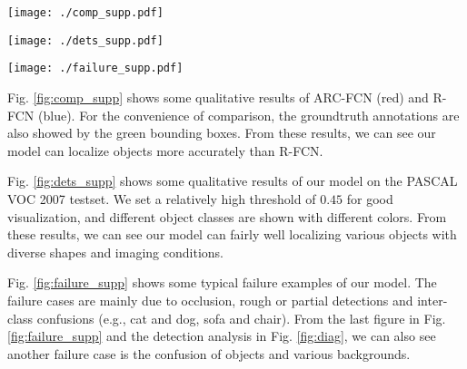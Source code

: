 \documentclass[10pt,twocolumn,letterpaper]{article}
\begin{document}
\begin{appendix}
\begin{figure*}
\centering
{\texttt{[image: ./comp\_supp.pdf]}}
\caption{Sample detections of R-FCN-Res101 \cite{rfcn} (blue) and ARC-FCN-Res101 (red). For comparison, we also show the groundtruth bounding box (green). The score threshold is set to $0.6$ for good visualization. Best viewed in color and zoom in. %
}
\label{fig:comp_supp}
\end{figure*} 

\begin{figure*}
\centering
{\texttt{[image: ./dets\_supp.pdf]}}
\caption{Qualitative Results of ARC-FCN-Res101 on Pascal VOC 2007 test set. For good displaying, different object classes are shown with different colors. The score threshold is set to $0.45$ for good visualization. Best viewed in color and zoom in. }
\label{fig:dets_supp}
\end{figure*} 

\begin{figure*}
\centering
{\texttt{[image: ./failure\_supp.pdf]}}
\caption{Failure examples of ARC-FCN-Res101 on Pascal VOC 2007 test set. 
Different object classes are shown with different colors.
The score threshold is set to $0.45$ for good visualization.
The failure cases are mainly due to occlusion, rough or partial detections, and inter-class or foreground/background confusions.
Best viewed in color and zoom in. }
\label{fig:failure_supp}
\end{figure*}

Fig. \ref{fig:comp_supp} shows some qualitative results of ARC-FCN (red) and R-FCN (blue). For the convenience of comparison, the groundtruth annotations are also showed by the green bounding boxes. From these results, we can see our model can localize objects more accurately than R-FCN.

Fig. \ref{fig:dets_supp} shows some qualitative results of our model on the PASCAL VOC 2007 testset. 
We set a relatively high threshold of $0.45$ for good visualization, and different object classes are shown with different colors. From these results, we can see our model can fairly well localizing various objects with diverse shapes and imaging conditions.


 
Fig. \ref{fig:failure_supp} shows some typical failure examples of our model. The failure cases are mainly due to occlusion, rough or partial detections and inter-class confusions (e.g., cat and dog, sofa and chair).
From the last figure in Fig. \ref{fig:failure_supp} and the detection analysis in Fig. \ref{fig:diag}, we can also see another failure case is the confusion of objects and various backgrounds.
\end{appendix}


{\small


}
\end{document}

